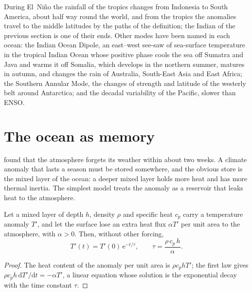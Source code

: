 During El~Niño the rainfall of the tropics changes from Indonesia to South America, about half way
round the world, and from the tropics the anomalies travel to the middle latitudes by the paths
of the definition; the Indian  of the previous section is one of their ends. Other modes
have been named in each ocean: the Indian Ocean Dipole, an east--west see-saw of sea-surface
temperature in the tropical Indian Ocean whose positive phase cools the sea off Sumatra and Java
and warms it off Somalia, which develops in the northern summer, matures in autumn, and changes
the rain of Australia, South-East Asia and East Africa; the Southern Annular Mode, the changes of
strength and latitude of the westerly belt around Antarctica; and the decadal variability of the
Pacific, slower than ENSO.

\section{The ocean as memory}\label{sec:b2:climate-variability:memory}

 found that the atmosphere forgets its weather within about two weeks.
A climate anomaly that lasts a season must be stored somewhere, and the obvious store is the mixed
layer of the ocean: a deeper mixed layer holds more heat and has more thermal inertia. The simplest model treats the
anomaly as a reservoir that leaks heat to the atmosphere.

\begin{proposition}\label{prop:b2:climate-variability:damping}
Let a mixed layer of depth $h$, density $\rho$ and specific heat $c_p$ carry a temperature anomaly
$T'$, and let the surface lose an extra heat flux $\alpha T'$ per unit area to the atmosphere,
with $\alpha > 0$. Then, without other forcing,
\[
  T'(t) = T'(0)\,\mathrm{e}^{-t/\tau}, \qquad \tau = \frac{\rho\,c_p\,h}{\alpha} .
\]
\end{proposition}

\begin{proof}
The heat content of the anomaly per unit area is $\rho c_p h T'$; the first law gives $\rho c_p h
\,\mathrm{d}T'/\mathrm{d}t = -\alpha T'$, a linear equation whose solution is the exponential
decay with the time constant $\tau$.
\end{proof}

